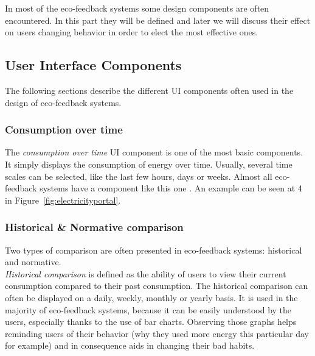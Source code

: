 \documentclass[journal]{vgtc}                %
\begin{document}
In most of the eco-feedback systems some design components are often encountered.
In this part they will be defined and later we will discuss their effect on users changing behavior in order to elect the most effective ones. 


\subsection{User Interface Components}
The following sections describe the different UI components often used in the design of eco-feedback systems.
\subsubsection{Consumption over time}
The \textit{consumption over time} UI component is one of the most basic components. It simply displays the consumption of energy over time. Usually, several time scales can be selected, like the last few hours, days or weeks.
Almost all eco-feedback systems have a component like this one \cite{spagnolli2011eco}. 
An example can be seen at 4 in Figure~\ref{fig:electricityportal}.

\subsubsection{Historical \& Normative comparison}
Two types of comparison are often presented in eco-feedback systems: historical and normative.\\

\textit{Historical comparison} is defined as the ability of users to view their current consumption compared to their past consumption. %
The historical comparison can often be displayed on a daily, weekly, monthly or yearly basis. It is used in the majority of eco-feedback systems, because it can be easily understood by the users, especially thanks to the use of bar charts. %
Observing those graphs helps reminding users of their behavior (why they used more energy this particular day for example) and in consequence aids in changing their bad habits.
\end{document}
